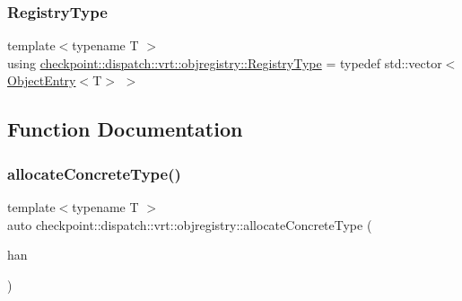 \subsubsection{\texorpdfstring{Registry\+Type}{RegistryType}}
{\footnotesize\ttfamily template$<$typename T $>$ \\
using \hyperlink{namespacecheckpoint_1_1dispatch_1_1vrt_1_1objregistry_a052bc9d365db250a655ce65d920c5980}{checkpoint\+::dispatch\+::vrt\+::objregistry\+::\+Registry\+Type} = typedef std\+::vector$<$\hyperlink{structcheckpoint_1_1dispatch_1_1vrt_1_1objregistry_1_1_object_entry}{Object\+Entry}$<$T$>$ $>$}



\subsection{Function Documentation}
\mbox{\label{namespacecheckpoint_1_1dispatch_1_1vrt_1_1objregistry_a744a3536afb9023749a6857bd1ec9f83}} 
\subsubsection{\texorpdfstring{allocate\+Concrete\+Type()}{allocateConcreteType()}}
{\footnotesize\ttfamily template$<$typename T $>$ \\
auto checkpoint\+::dispatch\+::vrt\+::objregistry\+::allocate\+Concrete\+Type (\begin{DoxyParamCaption}\item[{\hyperlink{namespacecheckpoint_1_1dispatch_1_1vrt_acd3f9e6b091bcfbc23dc35ea8ef45d3b}{Type\+Idx}}]{han }\end{DoxyParamCaption})\hspace{0.3cm}{\ttfamily [inline]}}

\mbox{\label{namespacecheckpoint_1_1dispatch_1_1vrt_1_1objregistry_a6fa4c97dc40026a2fe6a249e1c9d80e1}} 
